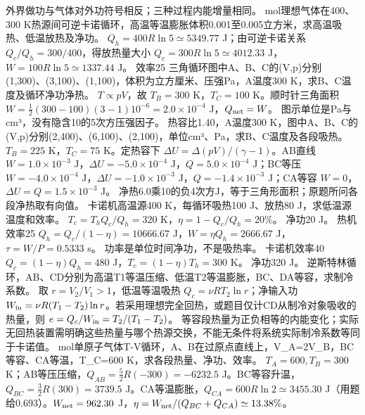 \crosscheck 外界做功与气体对外功符号相反；三种过程内能增量相同。
 mol理想气体在400、300 K热源间可逆卡诺循环，高温等温膨胀体积0.001至0.005立方米，求高温吸热、低温放热及净功。
\workings $Q_h=400R\ln5\simeq5349.77$ J；由可逆卡诺关系 $Q_c/Q_h=300/400$，得放热量大小 $Q_c=300R\ln5\simeq4012.33$ J，$W=100R\ln5\simeq1337.44$ J。
\crosscheck 效率25%
\problemtext 三角循环图中A、B、C的(V,p)分别(1,300)、(3,100)、(1,100)，体积为立方厘米、压强Pa，A温度300 K，求B、C温度及循环净功净热。
\workings $T\propto pV$，故 $T_B=300$ K，$T_C=100$ K。顺时针三角面积 $W=\frac12(300-100)(3-1)10^{-6}=2.0\times10^{-4}$ J，$Q_{\rm net}=W$。
\crosscheck 图示单位是Pa与cm³，没有隐含10的5次方压强因子。
\problemtext 热容比1.40，A温度300 K，图中A、B、C的(V,p)分别(2,400)、(6,100)、(2,100)，单位cm³、Pa，求B、C温度及各段吸热。
\workings $T_B=225$ K，$T_C=75$ K。定热容下 $\Delta U=\Delta(pV)/(\gamma-1)$。AB直线 $W=1.0\times10^{-3}$ J，$\Delta U=-5.0\times10^{-4}$ J，$Q=5.0\times10^{-4}$ J；BC等压 $W=-4.0\times10^{-4}$ J，$\Delta U=-1.0\times10^{-3}$ J，$Q=-1.4\times10^{-3}$ J；CA等容 $W=0$，$\Delta U=Q=1.5\times10^{-3}$ J。
\crosscheck 净热6.0乘10的负4次方J，等于三角形面积；原题所问各段净热取有向值。
\problemtext 卡诺机高温源400 K，每循环吸热100 J、放热80 J，求低温源温度和效率。
\workings $T_c=T_hQ_c/Q_h=320$ K，$\eta=1-Q_c/Q_h=20\%$。
\crosscheck 净功20 J。
\problemtext 热机效率25%
\workings $Q_h=Q_c/(1-\eta)=10666.67$ J，$W=\eta Q_h=2666.67$ J，$\tau=W/P=0.5333$ s。
\crosscheck 功率是单位时间净功，不是吸热率。
\problemtext 卡诺机效率40%
\workings $Q_c=(1-\eta)Q_h=480$ J，$T_c=(1-\eta)T_h=300$ K。
\crosscheck 净功320 J。
\problemtext 逆斯特林循环，AB、CD分别为高温T1等温压缩、低温T2等温膨胀，BC、DA等容，求制冷系数。
\workings 取 $r=V_2/V_1>1$，低温等温吸热 $Q_c=\nu RT_2\ln r$；净输入功 $W_{\rm in}=\nu R(T_1-T_2)\ln r$。若采用理想完全回热，或题目仅计CD从制冷对象吸收的热量，则 $e=Q_c/W_{\rm in}=T_2/(T_1-T_2)$。
\crosscheck 等容段热量为正负相等的内能变化；实际无回热装置需明确这些热量与哪个热源交换，不能无条件将系统实际制冷系数等同于卡诺值。
 mol单原子气体T-V循环，A、B在过原点直线上，V_A=2V_B，BC等容、CA等温，T_C=600 K，求各段热量、净功、效率。
\workings $T_A=600,T_B=300$ K；AB等压压缩，$Q_{AB}=\frac52R(-300)=-6232.5$ J。BC等容升温，$Q_{BC}=\frac32R(300)=3739.5$ J。CA等温膨胀，$Q_{CA}=600R\ln2\simeq3455.30$ J（用题给0.693）。$W_{\rm net}=962.30$ J，$\eta=W_{\rm net}/(Q_{BC}+Q_{CA})\simeq13.38\%$。
